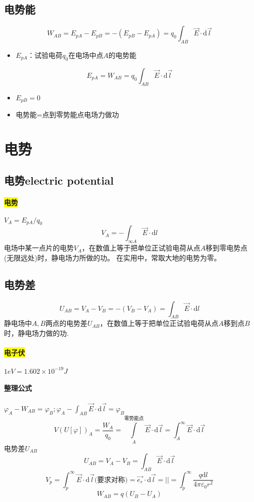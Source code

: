 \documentclass[UTF8,a4paper,12pt,scheme=chinese]{ctexbook}
\newcommand{\sll}[1]{\overrightarrow{#1}}
\newcommand{\ud}{\mathrm{d}}
\newcommand{\hl}[1]{\colorbox{yellow}{#1}}
\begin{document}
	\subsection{电势能}
	
	$$ W_{AB}=E_{pA}-E_{pB}=-(E_{pB}-E_{pA})=q_0\int_{AB}\sll{E}\cdot\ud\sll{l} $$
	\begin{itemize}
		\item $ E_{pA} $：试验电荷$ q_0 $在电场中点$ A $的电势能
	\end{itemize}
	$$ E_{pA}=W_{AB}=q_0\int_{AB}\sll{E}\cdot\ud\sll{l} $$
	\begin{itemize}
		\item $ E_{pB}=0 $
		\item 电势能=点到零势能点电场力做功
	\end{itemize}
	
	\section{电势}
	\subsection{电势electric potential}
	\paragraph{\hl{电势}}$ V_A=E_{pA}/q_0 $
	$$ V_A=-\int_{\infty A}\sll{E}\cdot\ud l $$
	电场中某一点片的电势$ V_A $，在数值上等于把单位正试验电荷从点$ A $移到零电势点(无限远处)时，静电场力所做的功。
	在实用中，常取大地的电势为零。
	\subsection{电势差}
	$$ U_{AB}=V_A-V_B=-(V_B-V_A)=\int_{AB}\sll{E}\cdot\ud l $$
	静电场中$ A,B $两点的电势差$ U_{AB} $，在数值上等于把单位正试验电荷从点$ A $移到点$ B $时，静电场力做的功.
	\paragraph{\hl{电子伏}}$ 1eV=1.602\times10^{-19}J $
	\paragraph{整理公式}$ \varphi_A-W_{AB}=\varphi_B ; \varphi_A-\int_{AB}\sll{E}\cdot\ud\sll{l}=\varphi_B $
	$$ V(U[\varphi])_A=\dfrac{W_A}{q_0}
	=\int\limits_{A}^{\mbox{零势能点}}\sll{E}\cdot\ud\sll{l} 
	=\int_{A}^{\infty}\sll{E}\cdot\ud\sll{l} 
	$$
	电势差$ U_{AB} $
	$$ U_{AB}=V_A-V_B=\int_{AB}\sll{E}\cdot\ud\sll{l} $$
	$$ V_p=\int_p^\infty\sll{E}\cdot\ud\sll{l}\mbox{(要求对称)}
	=\sll{e_r}\cdot\ud \sll{l} = ||
	=\int_p^\infty\dfrac{q\ud  l}{4\pi\varepsilon_0r^2} $$
	$$ W_{AB}=q(U_B-U_A)$$
\end{document}
